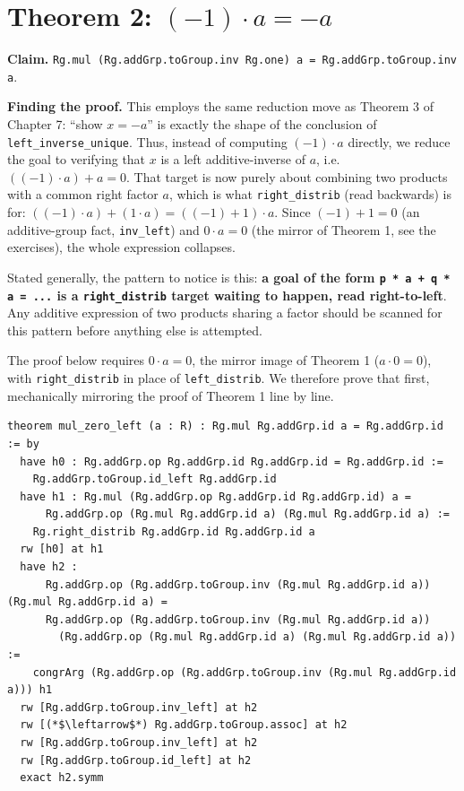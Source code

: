 \section{\texorpdfstring{Theorem 2: \((-1) \cdot a = -a\)}{Theorem 2: (-1) \textbackslash cdot a = -a}}\label{sec:09-ring-theorems:03-theorem-2:1}

\textbf{Claim.} \texttt{Rg.mul (Rg.addGrp.toGroup.inv Rg.one) a = Rg.addGrp.toGroup.inv a}.

\textbf{Finding the proof.} This employs the same reduction move as Theorem 3 of Chapter 7: ``show \(x = -a\)'' is exactly the shape of the conclusion of \texttt{left\_\allowbreak{}inverse\_\allowbreak{}unique}. Thus, instead of computing \((-1)\cdot a\) directly, we reduce the goal to verifying that \(x\) is a left additive-inverse of \(a\), i.e.~\(((-1)\cdot a) + a = 0\). That target is now purely about combining two products with a common right factor \(a\), which is what \texttt{right\_\allowbreak{}distrib} (read backwards) is for: \(((-1)\cdot a) + (1 \cdot a) = ((-1) + 1)\cdot a\). Since \((-1) + 1 = 0\) (an additive-group fact, \texttt{inv\_\allowbreak{}left}) and \(0 \cdot a = 0\) (the mirror of Theorem 1, see the exercises), the whole expression collapses.

Stated generally, the pattern to notice is this: \textbf{a goal of the form \texttt{p * a + q * a = ...} is a \texttt{right\_\allowbreak{}distrib} target waiting to happen, read right-to-left}. Any additive expression of two products sharing a factor should be scanned for this pattern before anything else is attempted.

The proof below requires \(0\cdot a = 0\), the mirror image of Theorem 1 (\(a\cdot 0 = 0\)), with \texttt{right\_\allowbreak{}distrib} in place of \texttt{left\_\allowbreak{}distrib}. We therefore prove that first, mechanically mirroring the proof of Theorem 1 line by line.

\begin{lstlisting}
theorem mul_zero_left (a : R) : Rg.mul Rg.addGrp.id a = Rg.addGrp.id := by
  have h0 : Rg.addGrp.op Rg.addGrp.id Rg.addGrp.id = Rg.addGrp.id :=
    Rg.addGrp.toGroup.id_left Rg.addGrp.id
  have h1 : Rg.mul (Rg.addGrp.op Rg.addGrp.id Rg.addGrp.id) a =
      Rg.addGrp.op (Rg.mul Rg.addGrp.id a) (Rg.mul Rg.addGrp.id a) :=
    Rg.right_distrib Rg.addGrp.id Rg.addGrp.id a
  rw [h0] at h1
  have h2 :
      Rg.addGrp.op (Rg.addGrp.toGroup.inv (Rg.mul Rg.addGrp.id a)) (Rg.mul Rg.addGrp.id a) =
      Rg.addGrp.op (Rg.addGrp.toGroup.inv (Rg.mul Rg.addGrp.id a))
        (Rg.addGrp.op (Rg.mul Rg.addGrp.id a) (Rg.mul Rg.addGrp.id a)) :=
    congrArg (Rg.addGrp.op (Rg.addGrp.toGroup.inv (Rg.mul Rg.addGrp.id a))) h1
  rw [Rg.addGrp.toGroup.inv_left] at h2
  rw [(*$\leftarrow$*) Rg.addGrp.toGroup.assoc] at h2
  rw [Rg.addGrp.toGroup.inv_left] at h2
  rw [Rg.addGrp.toGroup.id_left] at h2
  exact h2.symm
\end{lstlisting}

